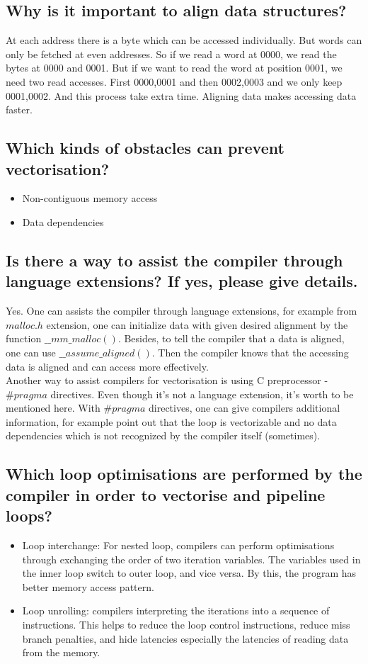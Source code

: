 \documentclass[article]{scrartcl}
\begin{document}
\subsection{Why is it important to align data structures?}
At each address there is a byte which can be accessed individually. But words can only be fetched at even addresses. So if we read a word at 0000, we read the bytes at 0000 and 0001. But if we want to read the word at position 0001, we need two read accesses. First 0000,0001 and then 0002,0003 and we only keep 0001,0002. And this process take extra time. Aligning data makes accessing data faster.
\subsection{Which kinds of obstacles can prevent vectorisation?}
\begin{itemize}
    \item Non-contiguous memory access
    \item Data dependencies
\end{itemize}
\subsection{Is there a way to assist the compiler through language extensions? If yes, please give details.}
Yes. One can assists the compiler through language extensions, for example from $malloc.h$ extension, one can initialize data with given desired alignment by the function $\_\_mm\_malloc()$. Besides, to tell the compiler that a data is aligned, one can use $\_\_assume\_aligned()$. Then the compiler knows that the accessing data is aligned and can access more effectively. \\

Another way to assist compilers for vectorisation is using C preprocessor - $\#pragma$ directives. Even though it's not a language extension, it's worth to be mentioned here. With $\#pragma$ directives, one can give compilers additional information, for example point out that the loop is vectorizable and no data dependencies which is not recognized by the compiler itself (sometimes).
\subsection{Which loop optimisations are performed by the compiler in order to vectorise and
pipeline loops?}
\begin{itemize}
  \item Loop interchange: For nested loop, compilers can perform optimisations through exchanging the order of two iteration variables. The variables used in the inner loop switch to outer loop, and vice versa. By this, the program has better memory access pattern.
  \item Loop unrolling: compilers interpreting the iterations into a sequence of instructions. This helps to reduce the loop control instructions, reduce miss branch penalties, and hide latencies especially the latencies of reading data from the memory.
\end{itemize}
\end{document}
